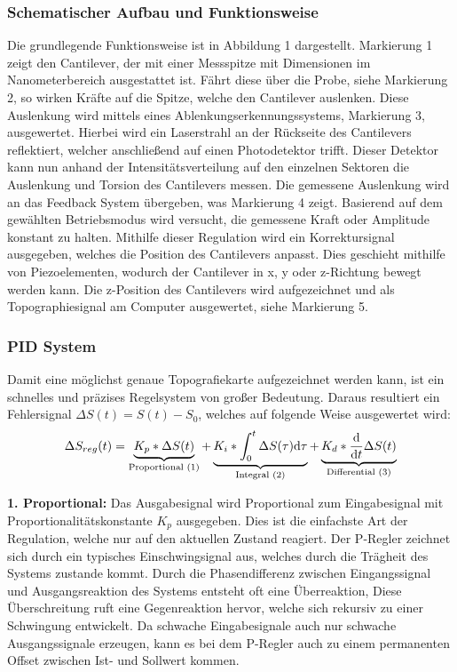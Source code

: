 \subsubsection{Schematischer Aufbau und Funktionsweise}
Die grundlegende Funktionsweise ist in Abbildung 1 dargestellt.
Markierung 1 zeigt den Cantilever, der mit einer Messspitze mit Dimensionen im Nanometerbereich ausgestattet ist.
Fährt diese über die Probe, siehe Markierung 2, so wirken Kräfte auf die Spitze, welche den Cantilever auslenken.
Diese Auslenkung wird mittels eines Ablenkungserkennungssystems, Markierung 3, ausgewertet.
Hierbei wird ein Laserstrahl an der Rückseite des Cantilevers reflektiert, welcher anschließend auf einen Photodetektor
trifft.
Dieser Detektor kann nun anhand der Intensitätsverteilung auf den einzelnen Sektoren die Auslenkung und Torsion des
Cantilevers messen.
Die gemessene Auslenkung wird an das Feedback System übergeben, was Markierung 4 zeigt.
Basierend auf dem gewählten Betriebsmodus wird versucht, die gemessene Kraft oder Amplitude konstant zu halten.
Mithilfe dieser Regulation wird ein Korrektursignal ausgegeben, welches die Position des Cantilevers anpasst.
Dies geschieht mithilfe von Piezoelementen, wodurch der Cantilever in x, y oder z-Richtung bewegt werden kann.
Die z-Position des Cantilevers wird aufgezeichnet und als Topographiesignal am Computer ausgewertet, siehe Markierung 5.
\subsubsection{PID System}
Damit eine möglichst genaue Topografiekarte aufgezeichnet werden kann, ist ein schnelles und präzises Regelsystem von großer Bedeutung.
Daraus resultiert ein Fehlersignal $\Delta S(t) = S(t)-S_0$, welches auf folgende Weise ausgewertet wird:
\begin{align*}
    \Delta S_{reg}(t) = \underbrace{ K_p * \Delta S(t) }_{\text{Proportional (1)}} + \underbrace{K_i * \int_{0}^{t} \Delta S(\tau) \mathrm{d} \tau}_{\text{Integral (2)}}
    + \underbrace{K_d * \frac{\mathrm{d}}{\mathrm{d} t} \Delta S(t)}_{\text{Differential (3)}}
\end{align*}

\textbf{1. Proportional:}
Das Ausgabesignal wird Proportional zum Eingabesignal mit Proportionalitätskonstante $K_p$ ausgegeben.
Dies ist die einfachste Art der Regulation, welche nur auf den aktuellen Zustand reagiert.
Der P-Regler zeichnet sich durch ein typisches Einschwingsignal aus, welches durch die Trägheit des Systems zustande kommt.
Durch die Phasendifferenz zwischen Eingangssignal und Ausgangsreaktion des Systems entsteht oft eine Überreaktion,
Diese Überschreitung ruft eine Gegenreaktion hervor, welche sich rekursiv zu einer Schwingung entwickelt.
Da schwache Eingabesignale auch nur schwache Ausgangssignale erzeugen, kann es bei dem P-Regler auch zu einem permanenten Offset zwischen
Ist- und Sollwert kommen.

